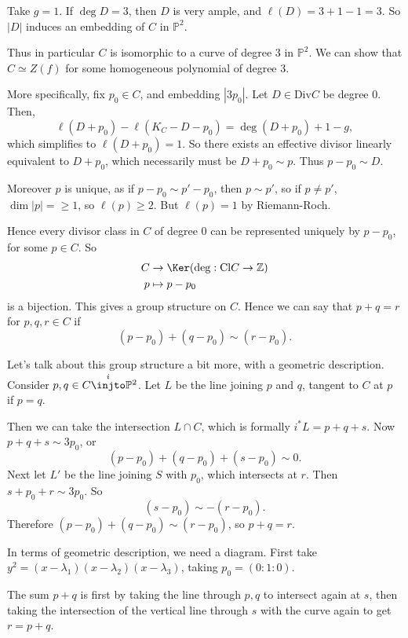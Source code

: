 \documentclass[12pt]{article}
\begin{document}
\begin{exbox}
	Take $g = 1$. If $\deg D = 3$, then $D$ is very ample, and $\ell(D) = 3 + 1 - 1 = 3$. So $|D|$ induces an embedding of $C$ in $\mathbb{P}^2$.

	Thus in particular $C$ is isomorphic to a curve of degree 3 in $\mathbb{P}^2$. We can show that $C \simeq Z(f)$ for some homogeneous polynomial of degree $3$.

	More specifically, fix $p_0 \in C$, and embedding $|3p_0|$. Let $D \in \mathrm{Div} C$ be degree 0. Then,
	\[
	\ell(D + p_0) - \ell(K_C - D - p_0) = \deg (D + p_0) + 1 - g,
	\]
	which simplifies to $\ell(D + p_0) = 1$. So there exists an effective divisor linearly equivalent to $D + p_0$, which necessarily must be $D + p_0 \sim p$. Thus $p - p_0 \sim D$.

	Moreover $p$ is unique, as if $p - p_0 \sim p' - p_0$, then $p \sim p'$, so if $p \neq p'$, $\dim |p| = \geq 1$, so $\ell(p) \geq 2$. But $\ell(p) = 1$ by Riemann-Roch.

	Hence every divisor class in $C$ of degree 0 can be represented uniquely by $p - p_0$, for some $p \in C$. So
	\begin{align*}
		C &\to \Ker(\deg : \mathrm{Cl} C \to \mathbb{Z}) \\
		p &\mapsto p - p_0
	\end{align*}
	is a bijection. This gives a group structure on $C$.
	Hence we can say that $p + q = r$ for $p, q, r \in C$ if
	\[
		(p - p_0) + (q - p_0) \sim (r - p_0).
	\]
\end{exbox}

Let's talk about this group structure a bit more, with a geometric description. Consider $p, q \in C \overset{i}{\injto} \mathbb{P}^2$. Let $L$ be the line joining $p$ and $q$, tangent to $C$ at $p$ if $p = q$.

Then we can take the intersection $L \cap C$, which is formally $i^\ast L = p + q + s$. Now $p + q + s \sim 3 p_0$, or
\[
	(p - p_0) + (q - p_0) + (s - p_0) \sim 0.
\]
Next let $L'$ be the line joining $S$ with $p_0$, which intersects at $r$. Then $s + p_0 + r \sim 3 p_0$. So
\[
	(s - p_0) \sim -(r - p_0).
\]
Therefore $(p - p_0) + (q - p_0) \sim (r - p_0)$, so $p + q = r$.

In terms of geometric description, we need a diagram. First take $y^2 = (x - \lambda_1)(x-\lambda_2)(x-\lambda_3)$, taking $p_0 = (0 : 1 : 0)$.

The sum $p + q$ is first by taking the line through $p, q$ to intersect again at $s$, then taking the intersection of the vertical line through $s$ with the curve again to get $r = p + q$.
\end{document}
